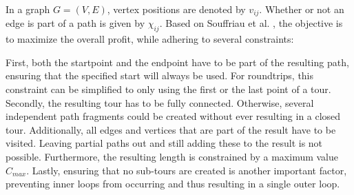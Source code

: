 In a graph $G=(V,E)$, vertex positions are denoted by $v_{ij}$.
Whether or not an edge is part of a path is given by $\chi_{ij}$.
Based on Souffriau et al. \cite{souffriau_planning_2011}, the objective is to maximize the overall profit, while adhering to several constraints:

First, both the startpoint and the endpoint have to be part of the resulting path, ensuring that the specified start will always be used. 
For roundtrips, this constraint can be simplified to only using the first or the last point of a tour.
Secondly, the resulting tour has to be fully connected.
Otherwise, several independent path fragments could be created without ever resulting in a closed tour.
Additionally, all edges and vertices that are part of the result have to be visited.
Leaving partial paths out and still adding these to the result is not possible.
Furthermore, the resulting length is constrained by a maximum value $C_{max}$.
Lastly, ensuring that no sub-tours are created is another important factor, preventing inner loops from occurring and thus resulting in a single outer loop.

%
%
%

